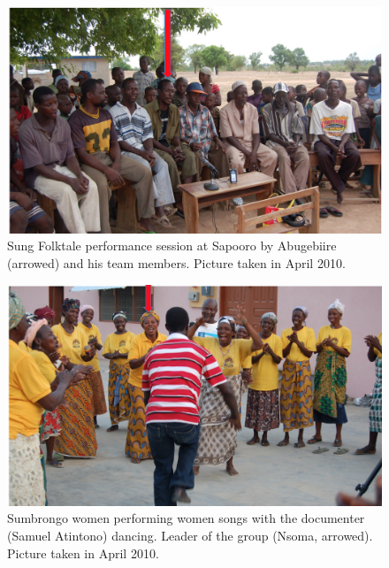 \documentclass[output=paper,colorlinks,citecolor=brown]{langscibook}
\begin{document}
\begin{figure}
\includegraphics[scale=0.55]{figures/abugebiire.png}
\caption{Sung Folktale performance session at Sapooro by Abugebiire (arrowed) and his team members. Picture taken in April 2010.
}

\end{figure}


\begin{figure}
\includegraphics[scale=0.55]{figures/sumbrongo.png}
\caption{Sumbrongo women performing women songs with the documenter (Samuel Atintono) dancing. Leader of the group (Nsoma, arrowed). Picture taken in April 2010.}
\end{figure}
\end{document}
